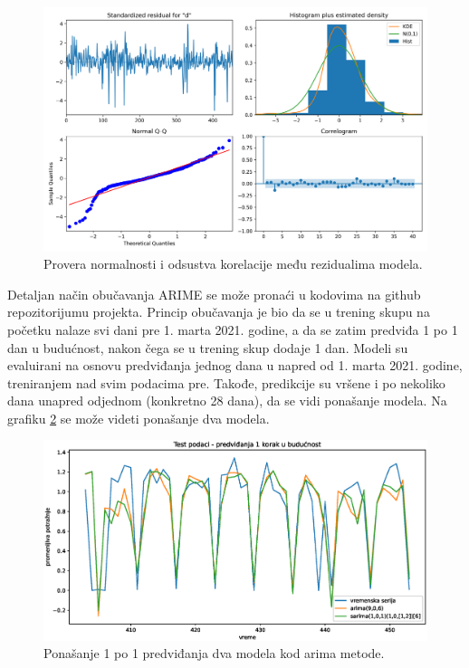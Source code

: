 \documentclass[12pt,oneside]{memoir}
\begin{document}
\begin{figure}[!ht]
  \centering
  \includegraphics[width=1\textwidth]{./grafici/reziduali_arima.png}
  \caption{Provera normalnosti i odsustva korelacije među rezidualima modela.}
  \label{fig: reziduali}
\end{figure}
Detaljan način obučavanja ARIME se može pronaći u kodovima na github repozitorijumu projekta. Princip obučavanja je bio da se u trening skupu na početku nalaze svi dani pre 1. marta 2021. godine, a da se zatim predviđa 1 po 1 dan u budućnost, nakon čega se u trening skup dodaje 1 dan. Modeli su evaluirani na osnovu predviđanja jednog dana u napred od 1. marta 2021. godine, treniranjem nad svim podacima pre. Takođe, predikcije su vršene i po nekoliko dana unapred odjednom (konkretno 28 dana), da se vidi ponašanje modela. Na grafiku \ref{fig: test_arima} se može videti ponašanje dva modela.
\begin{figure}[!ht]
  \centering
  \includegraphics[width=1\textwidth]{./grafici/test_dnevna_arima.eps}
  \caption{Ponašanje 1 po 1 predviđanja dva modela kod arima metode.}
  \label{fig: test_arima}
\end{figure}
\end{document}
